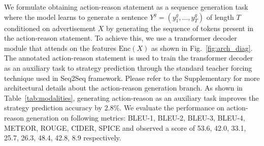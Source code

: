 We formulate obtaining action-reason statement as a sequence generation task where the model learns to generate a sentence $Y^g=(y^g_1, \ldots, y^g_T)$ of length $T$ conditioned on advertisement $X$ by generating the sequence of tokens present in the action-reason statement. To achieve this, we use a transformer decoder module that attends on the features $\text{Enc}(X)$ as shown in Fig.~\ref{fig:arch_diag}. The annotated action-reason statement is used to train the transformer decoder as an auxiliary task to strategy prediction through the standard teacher forcing technique used in Seq2Seq framework. Please refer to the Supplementary for more architectural details about the action-reason generation branch. As shown in Table~\ref{tab:modalities}, generating action-reason as an auxiliary task improves the strategy prediction accuracy by $2.8\%$. We evaluate the performance on action-reason generation on following metrics: BLEU-1, BLEU-2, BLEU-3, BLEU-4, METEOR, ROUGE, CIDER, SPICE and observed a score of 53.6, 42.0, 33.1, 25.7, 26.3, 48.4, 42.8, 8.9 respectively.





